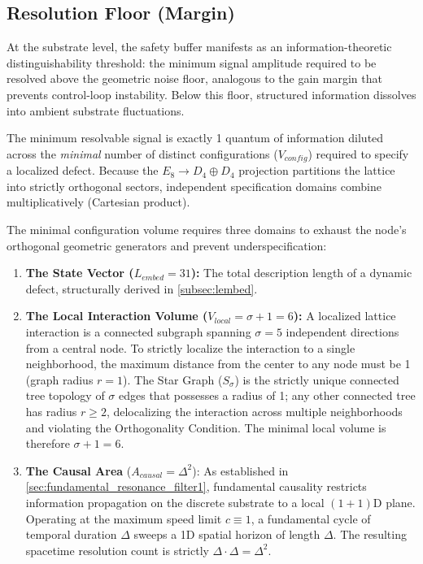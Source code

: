 \subsection{Resolution Floor (Margin)}
\label{subsec:alpha_mar}
At the substrate level, the safety buffer manifests as an information-theoretic distinguishability threshold: the minimum signal amplitude required to be resolved above the geometric noise floor, analogous to the gain margin that prevents control-loop instability. Below this floor, structured information dissolves into ambient substrate fluctuations.

The minimum resolvable signal is exactly 1 quantum of information diluted across the \emph{minimal} number of distinct configurations ($V_{config}$) required to specify a localized defect. Because the $E_8 \to D_4 \oplus D_4$ projection partitions the lattice into strictly orthogonal sectors, independent specification domains combine multiplicatively (Cartesian product).

The minimal configuration volume requires three domains to exhaust the node's orthogonal geometric generators and prevent underspecification:
\begin{enumerate}
    \item \textbf{The State Vector ($L_{embed} = 31$):} The total description length of a dynamic defect, structurally derived in \cref{subsec:lembed}.
    \item \textbf{The Local Interaction Volume ($V_{local} = \sigma + 1 = 6$):} A localized lattice interaction is a connected subgraph spanning $\sigma = 5$ independent directions from a central node. To strictly localize the interaction to a single neighborhood, the maximum distance from the center to any node must be 1 (graph radius $r=1$). The Star Graph ($S_\sigma$) is the strictly unique connected tree topology of $\sigma$ edges that possesses a radius of 1; any other connected tree has radius $r \ge 2$, delocalizing the interaction across multiple neighborhoods and violating the Orthogonality Condition. The minimal local volume is therefore $\sigma+1=6$.
    \item \textbf{The Causal Area} ($A_{causal} = \Delta^2$): As established in \cref{sec:fundamental_resonance_filter1}, fundamental causality restricts information propagation on the discrete substrate to a local $(1+1)$D plane. Operating at the maximum speed limit $c \equiv 1$, a fundamental cycle of temporal duration $\Delta$ sweeps a 1D spatial horizon of length $\Delta$. The resulting spacetime resolution count is strictly $\Delta \cdot \Delta = \Delta^2$.
\end{enumerate}

